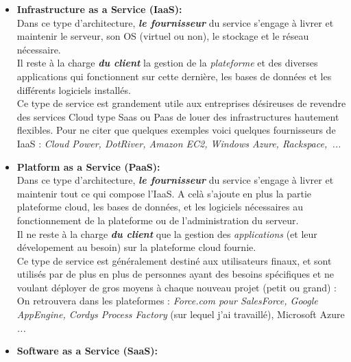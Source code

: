 \begin{itemize}
	\item \textbf{Infrastructure as a Service (IaaS):}\\ 
	
	Dans ce type d'architecture, \emph{\textbf{le fournisseur}} du service s'engage à livrer et maintenir le serveur, son OS (virtuel ou non), le stockage et le réseau nécessaire.\\
			
	Il reste à la charge \emph{\textbf{du client}} la gestion de la \textit{plateforme} et des diverses applications qui fonctionnent sur cette dernière, les bases de données et les différents logiciels installés.\\
	
	Ce type de service est grandement utile aux entreprises désireuses de revendre des services Cloud type Saas ou Paas de louer des infrastructures hautement flexibles. Pour ne citer que quelques exemples voici quelques fournisseurs de IaaS :\emph{ Cloud Power, DotRiver, Amazon EC2, Windows Azure, Rackspace,~...}\\
			\vspace{8mm}
			
		
	\item \textbf{Platform as a Service (PaaS):}\\
	
	Dans ce type d'architecture, \emph{\textbf{le fournisseur}} du service s'engage à livrer et maintenir tout ce qui compose l'IaaS. A celà s'ajoute en plus la partie plateforme cloud, les bases de données, et les logiciels nécessaires au fonctionnement de la plateforme ou de l'administration du serveur.\\
			
	Il ne reste à la charge \emph{\textbf{du client}} que la gestion des \textit{applications} (et leur dévelopement au besoin) sur la plateforme cloud fournie.\\

Ce type de service est généralement destiné aux utilisateurs finaux, et sont utilisés par de plus en plus de personnes ayant des besoins spécifiques et ne voulant déployer de gros moyens à chaque nouveau projet (petit ou grand) : On retrouvera dans les plateformes : \emph{Force.com pour SalesForce, Google AppEngine, Cordys Process Factory} (sur lequel j'ai travaillé), Microsoft Azure \emph{...}\\
			\vspace{8mm}
	
	
	\item \textbf{Software as a Service (SaaS):}\\
	

\end{itemize}
